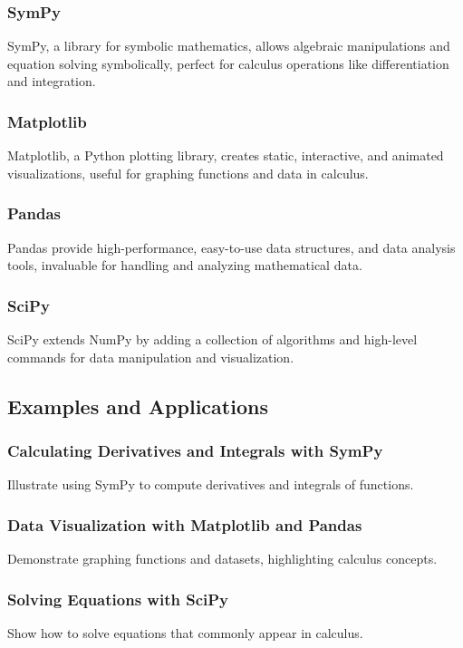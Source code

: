 \documentclass[a4paper,12pt]{book}
\begin{document}
\subsubsection*{SymPy}
SymPy, a library for symbolic mathematics, allows algebraic manipulations and equation solving symbolically, perfect for calculus operations like differentiation and integration.

\subsubsection*{Matplotlib}
Matplotlib, a Python plotting library, creates static, interactive, and animated visualizations, useful for graphing functions and data in calculus.

\subsubsection*{Pandas}
Pandas provide high-performance, easy-to-use data structures, and data analysis tools, invaluable for handling and analyzing mathematical data.

\subsubsection*{SciPy}
SciPy extends NumPy by adding a collection of algorithms and high-level commands for data manipulation and visualization.

\subsection*{Examples and Applications}

\subsubsection*{Calculating Derivatives and Integrals with SymPy}
Illustrate using SymPy to compute derivatives and integrals of functions.

\subsubsection*{Data Visualization with Matplotlib and Pandas}
Demonstrate graphing functions and datasets, highlighting calculus concepts.

\subsubsection*{Solving Equations with SciPy}
Show how to solve equations that commonly appear in calculus.
\end{document}
